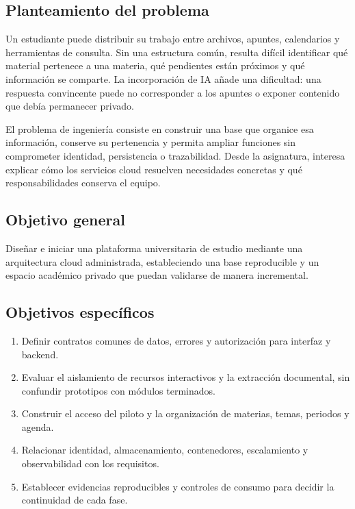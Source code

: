 \subsection{Planteamiento del problema}
Un estudiante puede distribuir su trabajo entre archivos, apuntes, calendarios y herramientas de consulta. Sin una estructura común, resulta difícil identificar qué material pertenece a una materia, qué pendientes están próximos y qué información se comparte. La incorporación de IA añade una dificultad: una respuesta convincente puede no corresponder a los apuntes o exponer contenido que debía permanecer privado.

El problema de ingeniería consiste en construir una base que organice esa información, conserve su pertenencia y permita ampliar funciones sin comprometer identidad, persistencia o trazabilidad. Desde la asignatura, interesa explicar cómo los servicios cloud resuelven necesidades concretas y qué responsabilidades conserva el equipo.

\subsection{Objetivo general}
Diseñar e iniciar una plataforma universitaria de estudio mediante una arquitectura cloud administrada, estableciendo una base reproducible y un espacio académico privado que puedan validarse de manera incremental.

\subsection{Objetivos específicos}
\begin{enumerate}
\item Definir contratos comunes de datos, errores y autorización para interfaz y backend.
\item Evaluar el aislamiento de recursos interactivos y la extracción documental, sin confundir prototipos con módulos terminados.
\item Construir el acceso del piloto y la organización de materias, temas, periodos y agenda.
\item Relacionar identidad, almacenamiento, contenedores, escalamiento y observabilidad con los requisitos.
\item Establecer evidencias reproducibles y controles de consumo para decidir la continuidad de cada fase.
\end{enumerate}


